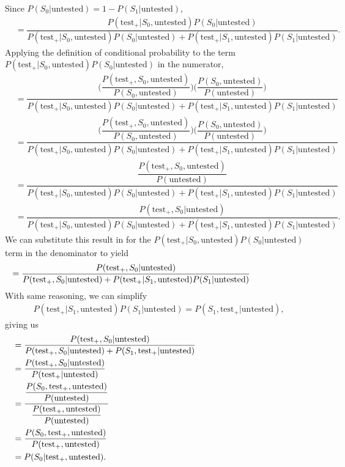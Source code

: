 \documentclass[12pt,twoside]{smiththesis}
\begin{document}
\noindent Since \(P(S_0|\text{untested}) = 1 - P(S_1|\text{untested})\),
\begin{align*} 
&=  \dfrac{{P(\text{test}_+|S_0, \text{untested})}P(S_0|\text{untested})}{P(\text{test}_+|S_0, \text{untested})P(S_0|\text{untested}) + P(\text{test}_+|S_1, \text{untested}) P(S_1|\text{untested})}.
\end{align*}
Applying the definition of conditional probability to the term
\(P(\text{test}_+|S_0, \text{untested})P(S_0|\text{untested})\) in the numerator,
\begin{align*}
&=
    \dfrac{\Big( \dfrac{P(\text{test}_+,S_0, \text{untested})}{P(S_0, \text{untested})} \Big) \Big(\dfrac{P(S_0, \text{untested})}{P(\text{untested})}\Big)}{P(\text{test}_+|S_0, \text{untested})P(S_0|\text{untested}) + P(\text{test}_+|S_1, \text{untested}) P(S_1|\text{untested})}\\ 
    &= \dfrac{\Big( \dfrac{P(\text{test}_+,S_0, \text{untested})}{P(S_0, \text{untested})} \Big) \Big(\dfrac{P(S_0, \text{untested})}{P(\text{untested})}\Big)}{P(\text{test}_+|S_0, \text{untested})P(S_0|\text{untested}) + P(\text{test}_+|S_1, \text{untested}) P(S_1|\text{untested})}\\
    &=  \dfrac{\dfrac{P(\text{test}_+,S_0, \text{untested})}{P(\text{untested})}}{P(\text{test}_+|S_0, \text{untested})P(S_0|\text{untested}) + P(\text{test}_+|S_1, \text{untested}) P(S_1|\text{untested})}\\
    &=  \dfrac{{P(\text{test}_+,S_0|\text{untested})}}{P(\text{test}_+|S_0, \text{untested})P(S_0|\text{untested}) + P(\text{test}_+|S_1, \text{untested}) P(S_1|\text{untested})}.
\end{align*}
\noindent We can substitute this result in for the \(P(\text{test}_+|S_0, \text{untested})P(S_0|\text{untested})\) term in the denominator to yield
\begin{align*}
  &=  \dfrac{{P(\text{test}_+,S_0|\text{untested})}}{P(\text{test}_+,S_0|\text{untested}) + P(\text{test}_+|S_1, \text{untested}) P(S_1|\text{untested})} \hspace{ 20 mm }
\end{align*}
With same reasoning, we can simplify
\begin{align*}
P(\text{test}_+|S_1, \text{untested})P(S_1|\text{untested}) = P(S_1, \text{test}_+|\text{untested}),
\end{align*} giving us
\begin{align*}
  &=  \dfrac{{P(\text{test}_+,S_0|\text{untested})}}{P(\text{test}_+,S_0|\text{untested}) +  P(S_1, \text{test}_+|\text{untested})} \hspace{45 mm }\\ 
   &=  \dfrac{{P(\text{test}_+,S_0|\text{untested})}}{P(\text{test}_+|\text{untested}) } \\
   &= \dfrac{\dfrac{P(S_0, \text{test}_+, \text{untested})}{P(\text{untested})}}{ \dfrac{P(\text{test}_+,\text{untested})}{P(\text{untested})}} \\ 
  &=\dfrac{P(S_0, \text{test}_+, \text{untested})}{P(\text{test}_+,\text{untested})} \\
  &= P(S_0 |\text{test}_+, \text{untested}).
\end{align*}
\end{document}
